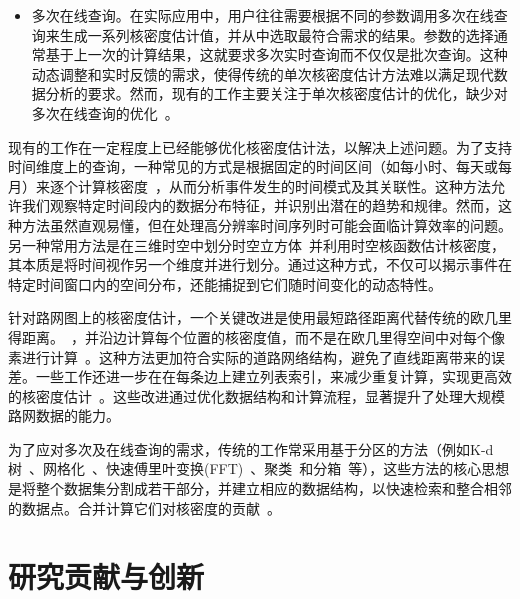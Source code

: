 \begin{itemize}[leftmargin=*]
	\item 多次在线查询。在实际应用中，用户往往需要根据不同的参数调用多次在线查询来生成一系列核密度估计值，并从中选取最符合需求的结果。参数的选择通常基于上一次的计算结果，这就要求多次实时查询而不仅仅是批次查询。这种动态调整和实时反馈的需求，使得传统的单次核密度估计方法难以满足现代数据分析的要求。然而，现有的工作主要关注于单次核密度估计的优化，缺少对多次在线查询的优化~\cite{gong_estimating_2014, gan_scalable_2017, plug_spatial_2011, brunsdon_visualising_2007, chan_safe_2021, cristianini_dynamically_1998, gramacki_nonparametric_2018}。
\end{itemize}

现有的工作在一定程度上已经能够优化核密度估计法，以解决上述问题。为了支持时间维度上的查询，一种常见的方式是根据固定的时间区间（如每小时、每天或每月）来逐个计算核密度~\cite{plug_spatial_2011}，从而分析事件发生的时间模式及其关联性。这种方法允许我们观察特定时间段内的数据分布特征，并识别出潜在的趋势和规律。然而，这种方法虽然直观易懂，但在处理高分辨率时间序列时可能会面临计算效率的问题。
另一种常用方法是在三维时空中划分时空立方体~\cite{nakaya_visualising_2010, black_highway_1991}并利用时空核函数估计核密度\cite{brunsdon_visualising_2007, romano_visualizing_2017, chan_sws_2021}，其本质是将时间视作另一个维度并进行划分。通过这种方式，不仅可以揭示事件在特定时间窗口内的空间分布，还能捕捉到它们随时间变化的动态特性。

针对路网图上的核密度估计，一个关键改进是使用最短路径距离代替传统的欧几里得距离。~\cite{borruso_network_2005}，并沿边计算每个位置的核密度值，而不是在欧几里得空间中对每个像素进行计算~\cite{xie_kernel_2008}。这种方法更加符合实际的道路网络结构，避免了直线距离带来的误差。一些工作还进一步在在每条边上建立列表索引，来减少重复计算，实现更高效的核密度估计~\cite{chan_fast_2021}。这些改进通过优化数据结构和计算流程，显著提升了处理大规模路网数据的能力。

为了应对多次及在线查询的需求，传统的工作常采用基于分区的方法（例如K-d树~\cite{chan_efficient_2020, chan_quad_2020, chan_karl_2019}、网格化~\cite{hart_kernel_2014, black_highway_1991}、快速傅里叶变换(FFT)~\cite{silverman_algorithm_1982, gramacki_nonparametric_2018}、聚类~\cite{auber_interactive_2005, abello_ask-graphview_2006, hinneburg_denclue_2007}和分箱~\cite{liu_immens_2013, gramacki_nonparametric_2018, li_interactive_2014}等），这些方法的核心思想是将整个数据集分割成若干部分，并建立相应的数据结构，以快速检索和整合相邻的数据点。合并计算它们对核密度的贡献~\cite{liu_immens_2013}。

\section{研究贡献与创新}


